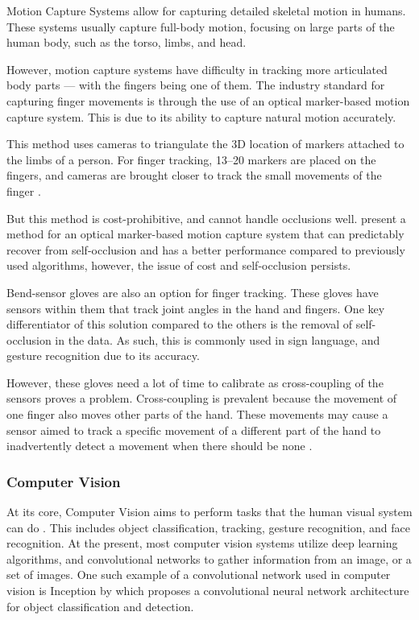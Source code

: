 \documentclass{report}
\begin{document}
Motion Capture Systems allow for capturing detailed skeletal motion in humans.
These systems usually capture full-body motion, focusing on large parts of the
human body, such as the torso, limbs, and head.

However, motion capture systems have difficulty in tracking more articulated
body parts --- with the fingers being one of them. The industry standard for
capturing finger movements is through the use of an optical marker-based motion
capture system. This is due to its ability to capture natural motion accurately.

This method uses cameras to triangulate the 3D location of markers attached to
the limbs of a person. For finger tracking, 13--20 markers are placed on the
fingers, and cameras are brought closer to track the small movements of the
finger \parencite{wheatland2015}.

But this method is cost-prohibitive, and cannot handle occlusions well.
\citeauthor{alexanderson2016} present a method for an optical marker-based
motion capture system that can predictably recover from self-occlusion and has a
better performance compared to previously used algorithms, however, the issue of
cost and self-occlusion persists.

Bend-sensor gloves are also an option for finger tracking. These gloves have
sensors within them that track joint angles in the hand and fingers. One key
differentiator of this solution compared to the others is the removal of
self-occlusion in the data. As such, this is commonly used in sign language, and
gesture recognition due to its accuracy.

However, these gloves need a lot of time to calibrate as cross-coupling of the
sensors proves a problem. Cross-coupling is prevalent because the movement of
one finger also moves other parts of the hand. These movements may cause a
sensor aimed to track a specific movement of a different part of the hand to
inadvertently detect a movement when there should be none
\parencite{wheatland2015}.

\subsubsection{Computer Vision}

At its core, Computer Vision aims to perform tasks that the human visual system
can do \parencite{cern}. This includes object classification, tracking, gesture
recognition, and face recognition. At the present, most computer vision systems
utilize deep learning algorithms, and convolutional networks to gather
information from an image, or a set of images. One such example of a
convolutional network used in computer vision is Inception by
\citeauthor{szegedy2015} which proposes a convolutional neural network
architecture for object classification and detection.
\end{document}
